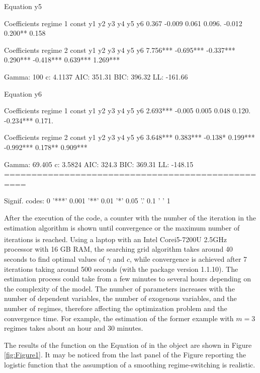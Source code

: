 \begin{example}
Equation y5 

Coefficients regime 1 
const      y1      y2      y3      y4      y5      y6 
0.367  -0.009   0.061   0.096. -0.012  0.200**  0.158  

Coefficients regime 2 
const        y1        y2        y3        y4        y5        y6 
7.756*** -0.695*** -0.337***  0.290*** -0.418***  0.639***  1.269*** 

Gamma: 100 	c: 4.1137 
AIC: 351.31 	BIC: 396.32 	LL: -161.66 

Equation y6 

Coefficients regime 1 
const        y1        y2        y3        y4        y5        y6 
2.693***   -0.005     0.005     0.048     0.120. -0.234***    0.171. 

Coefficients regime 2 
const        y1        y2        y3        y4        y5        y6 
3.648***  0.383***   -0.138*  0.199*** -0.992***   0.178**  0.909*** 

Gamma: 69.405 	c: 3.5824 
AIC: 324.3 	BIC: 369.31 	LL: -148.15 
==================================================

Signif. codes:  0 '***' 0.001 '**' 0.01 '*' 0.05 '.' 0.1 ' ' 1 
\end{example}
		
After the execution of the code, a counter with the number of the iteration in the estimation algorithm is shown until convergence or the maximum number of iterations is reached. Using a laptop with an Intel\textsuperscript{\textregistered} Core\texttrademark i5-7200U 2.5GHz processor with 16 GB RAM, the searching grid algorithm takes around 40 seconds to find optimal values of $\gamma$ and $c$, while convergence is achieved after 7 iterations taking around 500 seconds (with the package version 1.1.10). The estimation process could take from a few minutes to several hours depending on the complexity of the model. The number of parameters increases with the number of dependent variables, the number of exogenous variables, and the number of regimes, therefore affecting the optimization problem and the convergence time. For example, the estimation of the former example with $m=3$ regimes takes about an hour and 30 minutes.
		
The results of the  function on the Equation of  in the  object are shown in Figure \ref{fig:Figure1}. It may be noticed from the last panel of the Figure reporting the logistic function that the assumption of a smoothing regime-switching is realistic. 
		
